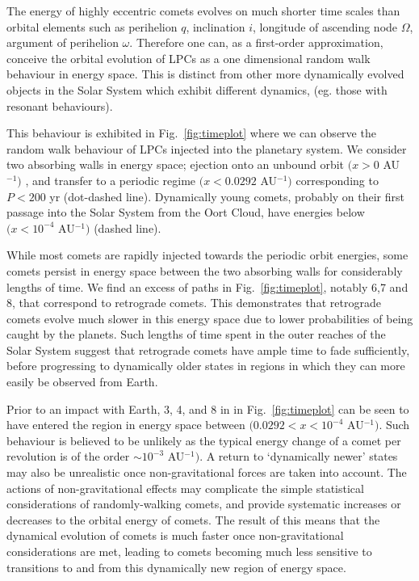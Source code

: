 The energy of highly eccentric comets evolves on much shorter time scales than orbital elements such as perihelion $q$, inclination $i$, longitude of ascending node $\Omega$, argument of perihelion $\omega$. Therefore one can, as a first-order approximation, conceive the orbital evolution of LPCs as a one dimensional random walk behaviour in energy space. This is distinct from other more dynamically evolved objects in the Solar System which exhibit different dynamics, (eg. those with resonant behaviours). 

This behaviour is exhibited in Fig.~\ref{fig:timeplot} where we can observe the random walk behaviour of LPCs injected into the planetary system. We consider two absorbing walls in energy space; ejection onto an unbound orbit $(x > 0$ AU$^{-1})$ , and transfer to a periodic regime $(x < 0.0292$ AU$^{-1})$ corresponding to $P < 200$ yr (dot-dashed line). Dynamically young comets, probably on their first passage into the Solar System from the Oort Cloud, have energies below $(x < 10^{-4}$ AU$^{-1})$ (dashed line).

While most comets are rapidly injected towards the periodic orbit energies, some comets persist in energy space between the two absorbing walls for considerably lengths of time. We find an excess of paths in Fig.~\ref{fig:timeplot}, notably 6,7 and 8, that correspond to retrograde comets. This demonstrates that retrograde comets evolve much slower in this energy space due to lower probabilities of being caught by the planets. Such lengths of time spent in the outer reaches of the Solar System suggest that retrograde comets have ample time to fade sufficiently, before progressing to dynamically older states in regions in which they can more easily be observed from Earth.

Prior to an impact with Earth, 3, 4, and 8 in in Fig.~\ref{fig:timeplot} can be seen to have entered the region in energy space between $(0.0292 < x < 10^{-4}$ AU$^{-1})$. Such behaviour is believed to be unlikely as the typical energy change of a comet per revolution is of the order $\sim10^{-3}$ AU$^{-1})$. A return to `dynamically newer' states may also be unrealistic once non-gravitational forces are taken into account. The actions of non-gravitational effects may complicate the simple statistical considerations of randomly-walking comets, and provide systematic increases or decreases to the orbital energy of comets. The result of this means that the dynamical evolution of comets is much faster once non-gravitational considerations are met, leading to comets becoming much less sensitive to transitions to and from this dynamically new region of energy space.


